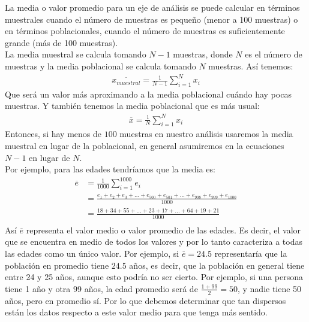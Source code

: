 \documentclass{article}
\begin{document}
La media o valor promedio para un eje de análisis se puede calcular en términos muestrales cuando el número de muestras es pequeño (menor a 100 muestras) o en términos poblacionales, cuando el número de muestras es suficientemente grande (más de 100 muestras). 
\\[12pt]
La media muestral se calcula tomando $N - 1$ muestras, donde $N$ es el número de muestras y la media poblacional se calcula tomando $N$ muestras. Así tenemos:
\begin{equation}
    \begin{aligned}
        \overline{x_{muestral}} = \frac{1}{N - 1} \sum_{i=1}^{N} x_i
    \end{aligned}
\end{equation}
Que será un valor más aproximando a la media poblacional cuándo hay pocas muestras. Y también tenemos la media poblacional que es más usual:
\begin{equation}
    \begin{aligned}
        \overline{x} = \frac{1}{N} \sum_{i=1}^{N} x_i
    \end{aligned}
\end{equation}
Entonces, si hay menos de $100$ muestras en nuestro análisis usaremos la media muestral en lugar de la poblacional, en general asumiremos en la ecuaciones $N-1$ en lugar de $N$.
\\[12pt]
Por ejemplo, para las edades tendríamos que la media es:
\begin{equation}
    \begin{aligned}
        \overline{e} &= \frac{1}{1000} \sum_{i=1}^{1000} e_i \\
        &= \frac{e_1 + e_2 + e_3 + ... + e_{500} + e_{501} + ... + e_{998} + e_{999} + e_{1000}}{1000} \\
        &= \frac{18 + 34 + 55 + ... + 23 + 17 + ... + 64 + 19 + 21}{1000} \\
    \end{aligned}
\end{equation}
Así $\overline{e}$ representa el valor medio o valor promedio de las edades. Es decir, el valor que se encuentra en medio de todos los valores y por lo tanto caracteriza a todas las edades como un único valor. Por ejemplo, si $\overline{e} = 24.5$ representaría que la población en promedio tiene $24.5$ años, es decir, que la población en general tiene entre 24 y 25 años, aunque esto podría no ser cierto. Por ejemplo, si una persona tiene 1 año y otra 99 años, la edad promedio será de $\frac{1 + 99}{2} = 50$, y nadie tiene 50 años, pero en promedio sí. Por lo que debemos determinar que tan dispersos están los datos respecto a este valor medio para que tenga más sentido.
\end{document}
